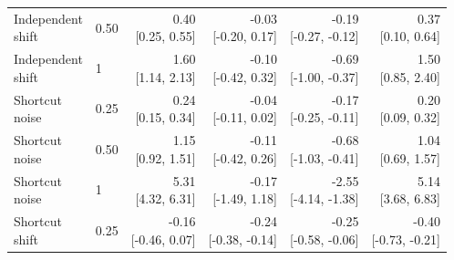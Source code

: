 \documentclass[10pt,letterpaper]{article}
\begin{document}
\begin{table}[!htbp]
{\begin{tabular}{@{}llrrrr@{}}
\makecell[l]{Independent\\shift} & 0.50 & \makecell[r]{0.40\\{}[0.25, 0.55]} & \makecell[r]{-0.03\\{}[-0.20, 0.17]} & \makecell[r]{-0.19\\{}[-0.27, -0.12]} & \makecell[r]{0.37\\{}[0.10, 0.64]} \\
\makecell[l]{Independent\\shift} & 1 & \makecell[r]{1.60\\{}[1.14, 2.13]} & \makecell[r]{-0.10\\{}[-0.42, 0.32]} & \makecell[r]{-0.69\\{}[-1.00, -0.37]} & \makecell[r]{1.50\\{}[0.85, 2.40]} \\
\midrule
\makecell[l]{Shortcut\\noise} & 0.25 & \makecell[r]{0.24\\{}[0.15, 0.34]} & \makecell[r]{-0.04\\{}[-0.11, 0.02]} & \makecell[r]{-0.17\\{}[-0.25, -0.11]} & \makecell[r]{0.20\\{}[0.09, 0.32]} \\
\makecell[l]{Shortcut\\noise} & 0.50 & \makecell[r]{1.15\\{}[0.92, 1.51]} & \makecell[r]{-0.11\\{}[-0.42, 0.26]} & \makecell[r]{-0.68\\{}[-1.03, -0.41]} & \makecell[r]{1.04\\{}[0.69, 1.57]} \\
\makecell[l]{Shortcut\\noise} & 1 & \makecell[r]{5.31\\{}[4.32, 6.31]} & \makecell[r]{-0.17\\{}[-1.49, 1.18]} & \makecell[r]{-2.55\\{}[-4.14, -1.38]} & \makecell[r]{5.14\\{}[3.68, 6.83]} \\
\makecell[l]{Shortcut\\shift} & 0.25 & \makecell[r]{-0.16\\{}[-0.46, 0.07]} & \makecell[r]{-0.24\\{}[-0.38, -0.14]} & \makecell[r]{-0.25\\{}[-0.58, -0.06]} & \makecell[r]{-0.40\\{}[-0.73, -0.21]} \\

\end{tabular}}
\end{table}
\end{document}
